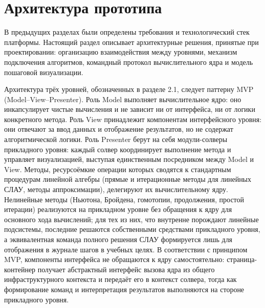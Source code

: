 \documentclass[12pt, oneside]{book}
\begin{document}
\section{Архитектура прототипа}

     \quad В предыдущих разделах были определены требования и технологический стек платформы. Настоящий раздел описывает архитектурные решения, принятые при проектировании: организацию взаимодействия между уровнями, механизм подключения алгоритмов, командный протокол вычислительного ядра и модель пошаговой визуализации.

    \quad Архитектура трёх уровней, обозначенных в разделе 2.1, следует паттерну MVP (Model–View–Presenter). Роль Model выполняет вычислительное ядро: оно инкапсулирует чистые вычисления и не зависит ни от интерфейса, ни от логики конкретного метода. Роль View принадлежит компонентам интерфейсного уровня: они отвечают за ввод данных и отображение результатов, но не содержат алгоритмической логики. Роль Presenter берут на себя модули-солверы прикладного уровня: каждый солвер координирует выполнение метода и управляет визуализацией, выступая единственным посредником между Model и View. Методы, ресурсоёмкие операции которых сводятся к стандартным процедурам линейной алгебры (прямые и итерационные методы для линейных СЛАУ, методы аппроксимации), делегируют их вычислительному ядру. Нелинейные методы (Ньютона, Бройдена, гомотопии, продолжения, простой итерации) реализуются на прикладном уровне без обращения к ядру для основного хода вычислений; для тех из них, что внутренне порождают линейные подсистемы, последние решаются собственными средствами прикладного уровня, а эквивалентная команда полного решения СЛАУ формируется лишь для отображения в журнале шагов в учебных целях. В соответствии с принципом MVP, компоненты интерфейса не обращаются к ядру самостоятельно: страница-контейнер получает абстрактный интерфейс вызова ядра из общего инфраструктурного контекста и передаёт его в контекст солвера, тогда как формирование команд и интерпретация результатов выполняются на стороне прикладного уровня.
\end{document}

